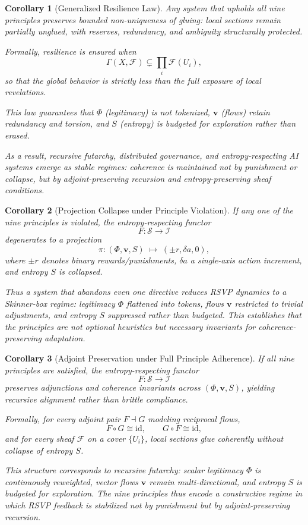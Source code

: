 \documentclass{article}
\newtheorem{corollary}{Corollary}
\begin{document}
\begin{corollary}[Generalized Resilience Law]
Any system that upholds all nine principles preserves 
\emph{bounded non-uniqueness of gluing}: local sections remain partially 
unglued, with reserves, redundancy, and ambiguity structurally protected.  

Formally, resilience is ensured when
\[
\Gamma(X,\mathcal{F}) \subsetneq \prod_{i} \mathcal{F}(U_i),
\]
so that the global behavior is strictly less than the full exposure of local 
revelations.  

This law guarantees that $\Phi$ (legitimacy) is not tokenized, $\mathbf{v}$ 
(flows) retain redundancy and torsion, and $S$ (entropy) is budgeted for 
exploration rather than erased.  

As a result, recursive futarchy, distributed governance, and entropy-respecting 
AI systems emerge as stable regimes: coherence is maintained not by punishment 
or collapse, but by adjoint-preserving recursion and entropy-preserving sheaf 
conditions.
\end{corollary}

\begin{corollary}[Projection Collapse under Principle Violation]
If any one of the nine principles is violated, the entropy-respecting functor
\[
F: \mathcal{S} \to \mathcal{I}
\]
degenerates to a projection
\[
\pi: (\Phi,\mathbf{v},S) \;\mapsto\; (\pm r, \delta a, 0),
\]
where $\pm r$ denotes binary rewards/punishments, $\delta a$ a single-axis
action increment, and entropy $S$ is collapsed.  

Thus a system that abandons even one directive reduces RSVP dynamics to a
Skinner-box regime: legitimacy $\Phi$ flattened into tokens, flows $\mathbf{v}$
restricted to trivial adjustments, and entropy $S$ suppressed rather than
budgeted. This establishes that the principles are not optional heuristics but
necessary invariants for coherence-preserving adaptation.
\end{corollary}

\begin{corollary}[Adjoint Preservation under Full Principle Adherence]
If all nine principles are satisfied, the entropy-respecting functor
\[
F: \mathcal{S} \to \mathcal{I}
\]
preserves adjunctions and coherence invariants across $(\Phi,\mathbf{v},S)$, 
yielding recursive alignment rather than brittle compliance.  

Formally, for every adjoint pair $F \dashv G$ modeling reciprocal flows,
\[
F \circ G \cong \text{id}, \qquad G \circ F \cong \text{id},
\]
and for every sheaf $\mathcal{F}$ on a cover $\{U_i\}$, local sections glue
coherently without collapse of entropy $S$.  

This structure corresponds to recursive futarchy: scalar legitimacy $\Phi$ is 
continuously reweighted, vector flows $\mathbf{v}$ remain multi-directional, 
and entropy $S$ is budgeted for exploration. The nine principles thus encode 
a constructive regime in which RSVP feedback is stabilized not by punishment 
but by adjoint-preserving recursion.
\end{corollary}
\end{document}
